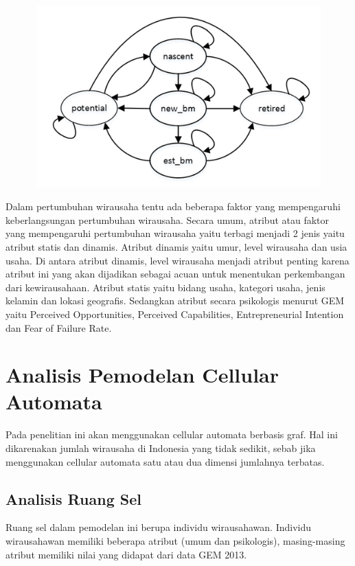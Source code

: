 \begin{figure} [H]
	\centering  
	\includegraphics[width=14cm, height=7cm]{tingkatwirausaha} 
	\label{fig:prosesWirausaha} 
\end{figure}


Dalam pertumbuhan wirausaha tentu ada beberapa faktor yang mempengaruhi keberlangsungan pertumbuhan wirausaha. Secara umum, atribut atau faktor yang mempengaruhi pertumbuhan wirausaha yaitu terbagi menjadi 2 jenis yaitu atribut statis dan dinamis. Atribut dinamis yaitu umur, level wirausaha dan usia usaha. Di antara atribut dinamis, level wirausaha menjadi atribut penting karena atribut ini yang akan dijadikan sebagai acuan untuk menentukan perkembangan dari kewirausahaan. Atribut statis yaitu bidang usaha, kategori usaha, jenis kelamin dan lokasi geografis. Sedangkan atribut secara psikologis menurut GEM yaitu Perceived Opportunities, Perceived Capabilities, Entrepreneurial Intention dan Fear of Failure Rate. 


\section{Analisis Pemodelan Cellular Automata}
\label{analisisCA}
Pada penelitian ini akan menggunakan cellular automata berbasis graf. Hal ini dikarenakan jumlah wirausaha di Indonesia yang tidak sedikit, sebab jika menggunakan cellular automata satu atau dua dimensi jumlahnya terbatas.

\subsection{Analisis Ruang Sel}
Ruang sel dalam pemodelan ini berupa individu wirausahawan. Individu wirausahawan memiliki beberapa atribut (umum dan psikologis), masing-masing atribut memiliki nilai yang didapat dari data GEM 2013.

